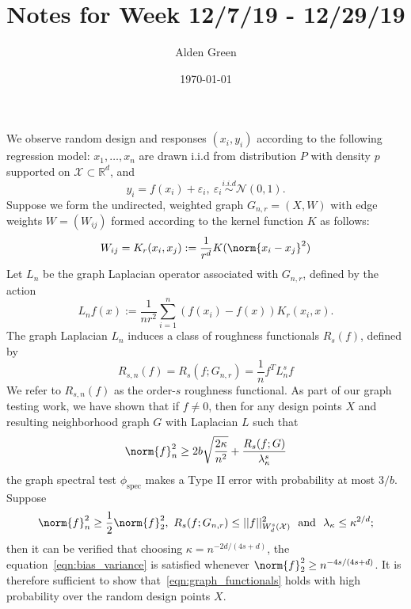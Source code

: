 \documentclass{article}
\newcommand{\Reals}{\mathbb{R}}
\newcommand{\1}{\mathbf{1}}
\newcommand{\Xset}{\mathcal{X}}
\newcommand{\spec}{\mathrm{spec}}
\theoremstyle{alden}
\theoremstyle{aldenthm}
\theoremstyle{definition}
\theoremstyle{remark}
\begin{document}
\title{Notes for Week 12/7/19 - 12/29/19}
\author{Alden Green}
\date{\today}
\maketitle

We observe random design and responses $(x_i,y_i)$ according to the following regression model: $x_1,\ldots,x_n$ are drawn i.i.d from distribution $P$ with density $p$ supported on $\mathcal{X} \subset \Reals^d$, and
\begin{equation*}
y_i = f(x_i) + \varepsilon_i,~ \varepsilon_i \overset{i.i.d}{\sim} \mathcal{N}(0,1).
\end{equation*}
Suppose we form the undirected, weighted graph $G_{n,r} = (X,W)$ with edge weights $W = (W_{ij})$ formed according to the kernel function $K$ as follows:
\begin{equation*}
W_{ij} = K_r(x_i,x_j) := \frac{1}{r^d}K(\norm{x_i - x_j}^2)
\end{equation*}
Let $L_n$ be the graph Laplacian operator associated with $G_{n,r}$, defined by the action
\begin{equation*}
L_nf(x) := \frac{1}{nr^2} \sum_{i = 1}^{n}(f(x_i) - f(x))K_r(x_i,x).
\end{equation*}
The graph Laplacian $L_n$ induces a class of roughness functionals $R_s(f)$, defined by
\begin{equation*}
R_{s,n}(f) = R_s(f;G_{n,r}) = \frac{1}{n} f^T L_n^s f
\end{equation*} 
We refer to $R_{s,n}(f)$ as the order-$s$ roughness functional. As part of our graph testing work, we have shown that if $f \neq 0$, then for any design points $X$ and resulting neighborhood graph $G$ with Laplacian $L$ such that
\begin{equation}
\label{eqn:bias_variance}
\norm{f}_n^2 \geq 2b\sqrt{\frac{2\kappa}{n^2}} + \frac{R_{s}(f;G) }{\lambda_{\kappa}^s}
\end{equation}
the graph spectral test $\phi_{\spec}$ makes a Type II error with probability at most $3/b$. Suppose
\begin{equation}
\label{eqn:graph_functionals}
\norm{f}_n^2 \geq \frac{1}{2}\norm{f}_2^2, ~R_s(f;G_{n,r}) \leq ||f||_{W_{d}^{s}(\Xset)}^2 ~~\textrm{and}~~ \lambda_{\kappa} \leq \kappa^{2/d};
\end{equation}
then it can be verified that choosing $\kappa = n^{-2d/(4s + d)}$, the equation~\eqref{eqn:bias_variance} is satisfied whenever $\norm{f}_2^2 \geq n^{-4s/(4s + d)}$. It is therefore sufficient to show that~\eqref{eqn:graph_functionals} holds with high probability over the random design points $X$.
\end{document}
